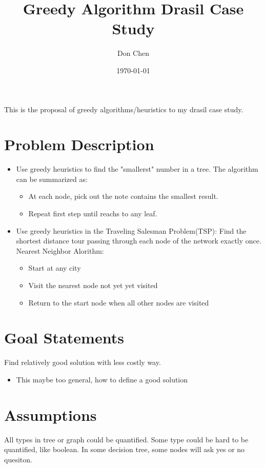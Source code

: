\documentclass[12pt]{article}
\title{Greedy Algorithm Drasil Case Study}
\author{Don Chen}
\date{\today}
\begin{document}
\maketitle
This is the proposal of greedy algorithms/heuristics to my drasil case study.

\section{Problem Description}
\begin{itemize}
    \item Use greedy heuristics to find the "smallerst" number in a tree. 
    The algorithm can be summarized as:
    \begin{itemize}
        \item At each node, pick out the note contains the smallest result.
        \item Repeat first step until reachs to any leaf.
    \end{itemize}
    \item Use greedy heuristics in the Traveling Salesman Problem(TSP): 
    Find the shortest distance tour passing through each node of the network exactly once. Nearest Neighbor Alorithm:
    \begin{itemize}
        \item Start at any city
        \item Visit the nearest node not yet yet visited
        \item Return to the start node when all other nodes are visited
    \end{itemize}
\end{itemize}

\section{Goal Statements}
Find relatively good solution with less costly way.
\begin{itemize}
    \item This maybe too general, how to define a good solution
\end{itemize}

\section{Assumptions}
All types in tree or graph could be quantified. Some type could be hard to be quantified, like boolean. In some decision tree,
some nodes will ask yes or no quesiton.
\end{document}
